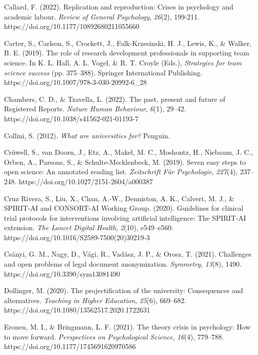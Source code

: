 \documentclass[meta, authordate]{jote-new-article}
\begin{document}
Callard, F. (2022). Replication and reproduction: Crises in psychology and academic labour. \emph{Review of General Psychology}, \emph{26}(2), 199-211. https://doi.org/10.1177/10892680211055660



Carter, S., Carlson, S., Crockett, J., Falk-Krzesinski, H. J., Lewis, K., & Walker, B. E. (2019). The role of research development professionals in supporting team science. In K. L. Hall, A. L. Vogel, & R. T. Croyle (Eds.), \emph{Strategies for team science success} (pp. 375–388). Springer International Publishing. https://doi.org/10.1007/978-3-030-20992-6_28



Chambers, C. D., & Tzavella, L. (2022). The past, present and future of Registered Reports. \emph{Nature Human Behaviour}, \emph{6}(1), 29–42. https://doi.org/10.1038/s41562-021-01193-7



Collini, S. (2012). \emph{What are universities for?} Penguin.



Crüwell, S., van Doorn, J., Etz, A., Makel, M. C., Moshontz, H., Niebaum, J. C., Orben, A., Parsons, S., & Schulte-Mecklenbeck, M. (2019). Seven easy steps to open science: An annotated reading list. \emph{Zeitschrift Für Psychologie}, \emph{227}(4), 237–248. https://doi.org/10.1027/2151-2604/a000387



Cruz Rivera, S., Liu, X., Chan, A.-W., Denniston, A. K., Calvert, M. J., & SPIRIT-AI and CONSORT-AI Working Group. (2020). Guidelines for clinical trial protocols for interventions involving artificial intelligence: The SPIRIT-AI extension. \emph{The Lancet Digital Health}, \emph{2}(10), e549–e560. https://doi.org/10.1016/S2589-7500(20)30219-3



Csányi, G. M., Nagy, D., Vági, R., Vadász, J. P., & Orosz, T. (2021). Challenges and open problems of legal document anonymization. \emph{Symmetry}, \emph{13}(8), 1490. https://doi.org/10.3390/sym13081490



Dollinger, M. (2020). The projectification of the university: Consequences and alternatives. \emph{Teaching in Higher Education}, \emph{25}(6), 669–682. https://doi.org/10.1080/13562517.2020.1722631



Eronen, M. I., & Bringmann, L. F. (2021). The theory crisis in psychology: How to move forward. \emph{Perspectives on Psychological Science}, \emph{16}(4), 779–788. https://doi.org/10.1177/1745691620970586
\end{document}
